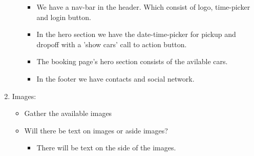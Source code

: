 \documentclass{article}
\begin{document}
\begin{enumerate}
\begin{itemize}
\begin{itemize}
            \item We have a nav-bar in the header. Which consist of logo, time-picker and login button.
            \item In the hero section we have the date-time-picker for pickup and dropoff with a 'show cars' call to action button.
            \item The booking page's hero section consists of the avilable cars.
            \item In the footer we have contacts and social network.
        \end{itemize}
    \end{itemize}
    \item Images:
    \begin{itemize}
        \item Gather the available images
        \item Will there be text on images or aside images?
        \begin{itemize}
            \item There will be text on the side of the images.
        \end{itemize}
        

\end{itemize}
\end{enumerate}
\end{document}
